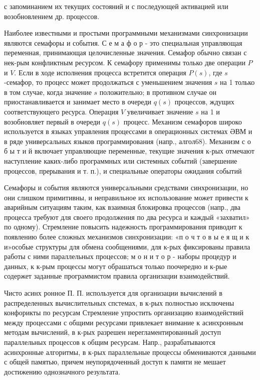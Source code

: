 \documentclass[10pt]{article}
\begin{document}
с запоминанием их текущих состояний и с последующей активацией или возобновлением др. процессов.



Наиболее известными и простыми программными механизмами синхронизации являются семафоры и события. С е м а ф о р - это специальная управляющая переменная, принимающая целочисленные значения. Семафор обычно связан с нек-рым конфликтным ресурсом. $К$ семафору применимы только две операции $P$ и $V$. Если в ходе исполнения процесса встретится операция $P(s)$, где $s$-семафор, то процесс может продолжаться с уменьшением значения $s$ на 1 только в том случае, когда значение $s$ положительно; в противном случае он приостанавливается и занимает место в очереди $q(s)$ процессов, ждущих соответствующего ресурса. Операция $V$ увеличивает значение $s$ на 1 и возобновляет первый в очереди $q(s)$ процесс. Механизм семафоров широко используется в языках управления процессами в операционных системах ӘВМ и в ряде универсальных языков программирования (напр., алгол68). Механизм с о б ы т и й включает управляющие переменные, текущие значения к-рых отмечают наступление каких-либо программных или системных событий (завершение процессов, прерывания и т. п.), и специальные операторы ожидания событий



Семафоры и события являются универсальными средствами синхронизации, но они слишком примитивны, и неправильное их использование может привести к аварийным ситуациям таким, как взаимная блокировка процессов (напр., два процесса требуют для своего продолжения по два ресурса и каждый «захватил» по одному). Стремление повысить надежность программирования приводит к появлению более сложных механизмов синхронизации: «п о ч т о в ы е я щ и к и»особые структуры для обмена сообщениями, для к-рых фиксированы правила работы с ними параллельных процессов; м о н и т о р - наборы процедур и данных, к к-рым процессы могут обрашаться только поочередно и к-рые содержет заданные программистом правила организации взаимодействий.



Чисто асинх ронное П. П. используется для организации вычислений в распределенных вычислительных спстемах, в к-рых полностью исключены конфорикты по ресурсам Стремление упростить организацию взаимодействий между процессами с общими ресурсами привлекает внимание к асинхронным методам вычислений, в к-рых разрешен нерегламентированный доступ параллельных процессов к общим ресурсам. Напр., разрабатываются асинхронные алгоритмы, в к-рых параллельные процессы обмениваются данными с общей памятью, причем неупорядоченный доступ к памяти не мешает достижению однозначного результата.
\end{document}
